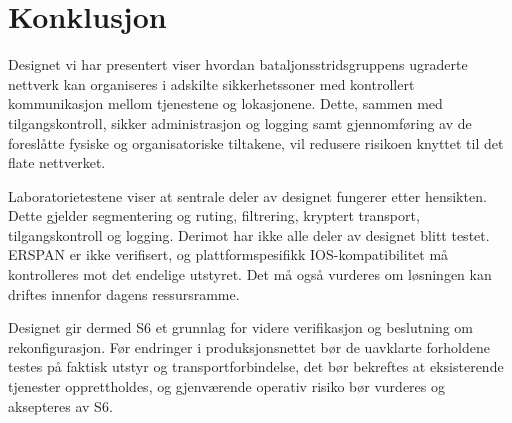 \section{Konklusjon}
Designet vi har presentert viser hvordan bataljonsstridsgruppens ugraderte nettverk kan organiseres i adskilte sikkerhetssoner med kontrollert kommunikasjon mellom tjenestene og lokasjonene. Dette, sammen med tilgangskontroll, sikker administrasjon og logging samt gjennomføring av de foreslåtte fysiske og organisatoriske tiltakene, vil redusere risikoen knyttet til det flate nettverket.

Laboratorietestene viser at sentrale deler av designet fungerer etter hensikten. Dette gjelder segmentering og ruting, filtrering, kryptert transport, tilgangskontroll og logging. Derimot har ikke alle deler av designet blitt testet. ERSPAN er ikke verifisert, og plattformspesifikk IOS-kompatibilitet må kontrolleres mot det endelige utstyret. Det må også vurderes om løsningen kan driftes innenfor dagens ressursramme.

Designet gir dermed S6 et grunnlag for videre verifikasjon og beslutning om rekonfigurasjon. Før endringer i produksjonsnettet bør de uavklarte forholdene testes på faktisk utstyr og transportforbindelse, det bør bekreftes at eksisterende tjenester opprettholdes, og gjenværende operativ risiko bør vurderes og aksepteres av S6.

